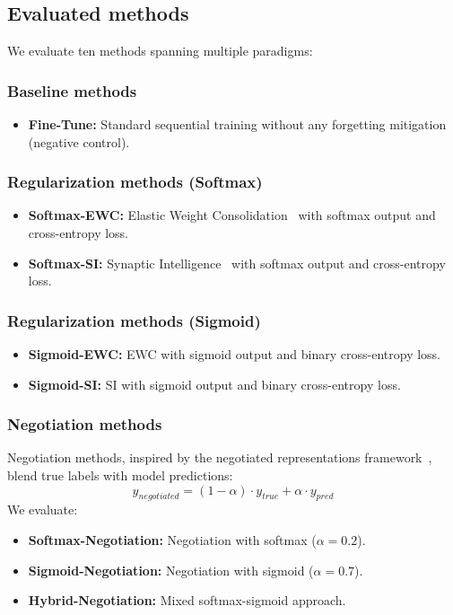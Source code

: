 \documentclass[preprint,review,12pt]{elsarticle}
\begin{document}
\subsection{Evaluated methods}

We evaluate ten methods spanning multiple paradigms:

\subsubsection{Baseline methods}
\begin{itemize}
\item \textbf{Fine-Tune:} Standard sequential training without any forgetting mitigation (negative control).
\end{itemize}

\subsubsection{Regularization methods (Softmax)}
\begin{itemize}
\item \textbf{Softmax-EWC:} Elastic Weight Consolidation~\cite{kirkpatrick2017overcoming} with softmax output and cross-entropy loss.
\item \textbf{Softmax-SI:} Synaptic Intelligence~\cite{zenke2017continual} with softmax output and cross-entropy loss.
\end{itemize}

\subsubsection{Regularization methods (Sigmoid)}
\begin{itemize}
\item \textbf{Sigmoid-EWC:} EWC with sigmoid output and binary cross-entropy loss.
\item \textbf{Sigmoid-SI:} SI with sigmoid output and binary cross-entropy loss.
\end{itemize}

\subsubsection{Negotiation methods}
Negotiation methods, inspired by the negotiated representations framework~\cite{korhan2023negotiated}, blend true labels with model predictions:
\begin{equation}
y_{negotiated} = (1 - \alpha) \cdot y_{true} + \alpha \cdot y_{pred}
\end{equation}
We evaluate:
\begin{itemize}
\item \textbf{Softmax-Negotiation:} Negotiation with softmax ($\alpha = 0.2$).
\item \textbf{Sigmoid-Negotiation:} Negotiation with sigmoid ($\alpha = 0.7$).
\item \textbf{Hybrid-Negotiation:} Mixed softmax-sigmoid approach.
\end{itemize}
\end{document}
